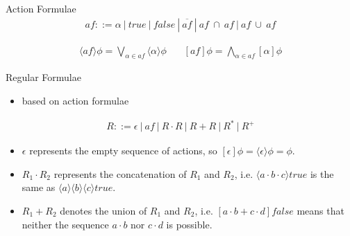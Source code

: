 \documentclass{beamer}
\begin{document}
  \begin{frame}{Action Formulae}
    \begin{align*}
      af ::= \alpha\ |\ true\ |\ false\ |\ \overline{af}\ |\ af\ \cap\ af\ |\ af\ \cup\ af
    \end{align*}

    \begin{align*}
      \langle{af}\rangle\phi = \bigvee_{\alpha \in af} \langle\alpha\rangle\phi
      \ \ \ \ \ \ \ \
      [af]\phi = \bigwedge_{\alpha \in af} [\alpha]\phi
    \end{align*}
  \end{frame}

  \begin{frame}{Regular Formulae}
    \begin{itemize}
      \item based on action formulae
    \end{itemize}

    \begin{align*}
      R ::= \epsilon\ |\ af\ |\ R\cdot{R}\ |\ R+R\ |\ R^*\ |\ R^+
    \end{align*}

    \begin{itemize}
      \item $\epsilon$ represents the empty sequence of actions, so $[\epsilon]\phi = \langle\epsilon\rangle\phi = \phi$.
      \item $R_1\cdot{R_2}$ represents the concatenation of $R_1$ and $R_2$, i.e. $\langle{a}\cdot{b}\cdot{c}\rangle{true}$ is the same as $\langle{a}\rangle\langle{b}\rangle\langle{c}\rangle{true}$.
      \item $R_1+R_2$ denotes the union of  $R_1$ and $R_2$, i.e. $[a\cdot{b} + c\cdot{d}]false$ means that neither the sequence $a\cdot{b}$ nor $c\cdot{d}$ is possible.
    \end{itemize}
  \end{frame}
\end{document}
